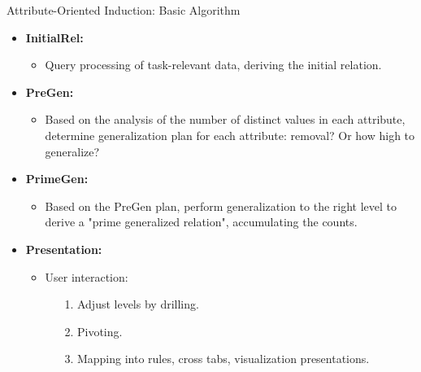 \begin{frame}{Attribute-Oriented Induction: Basic Algorithm}
	\begin{itemize}
		\item \textbf{InitialRel:}
		      \begin{itemize}
			      \item Query processing of task-relevant data, deriving the initial relation.
		      \end{itemize}
		\item \textbf{PreGen:}
		      \begin{itemize}
			      \item Based on the analysis of the number of distinct values in each attribute, determine generalization plan for each attribute: removal? Or how high to generalize?
		      \end{itemize}
		\item \textbf{PrimeGen:}
		      \begin{itemize}
			      \item Based on the PreGen plan, perform generalization to the right level to derive a "prime generalized relation", accumulating the counts.
		      \end{itemize}
		\item \textbf{Presentation:}
		      \begin{itemize}
			      \item User interaction:
			            \begin{itemize}
				            \item[1.] Adjust levels by drilling.
				            \item[2.] Pivoting.
				            \item[3.] Mapping into rules, cross tabs, visualization presentations.
			            \end{itemize}
		      \end{itemize}
	\end{itemize}
\end{frame}

